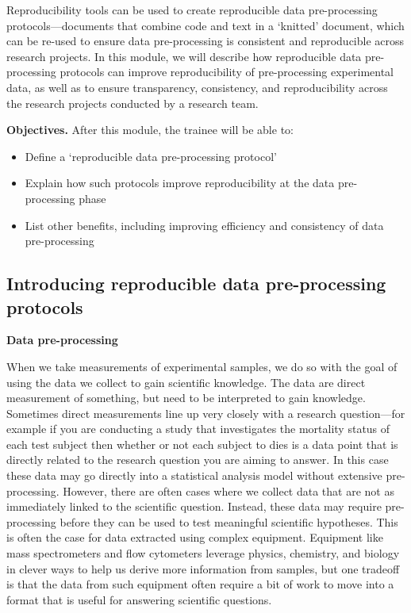 \documentclass[]{tufte-book}
\providecommand{\tightlist}{%
  \setlength{\itemsep}{0pt}\setlength{\parskip}{0pt}}
\begin{document}
Reproducibility tools can be used to create reproducible data pre-processing
protocols---documents that combine code and text in a `knitted' document, which
can be re-used to ensure data pre-processing is consistent and reproducible
across research projects. In this module, we will describe how reproducible data
pre-processing protocols can improve reproducibility of pre-processing
experimental data, as well as to ensure transparency, consistency, and
reproducibility across the research projects conducted by a research team.

\textbf{Objectives.} After this module, the trainee will be able to:

\begin{itemize}
\tightlist
\item
  Define a `reproducible data pre-processing protocol'
\item
  Explain how such protocols improve reproducibility at the data pre-processing
  phase
\item
  List other benefits, including improving efficiency and consistency of data
  pre-processing
\end{itemize}

\hypertarget{introducing-reproducible-data-pre-processing-protocols}{%
\subsection{Introducing reproducible data pre-processing protocols}\label{introducing-reproducible-data-pre-processing-protocols}}

\textbf{Data pre-processing}

When we take measurements of experimental samples, we do so with the goal of
using the data we collect to gain scientific knowledge. The data are direct
measurement of something, but need to be interpreted to gain knowledge.
Sometimes direct measurements line up very closely with a research
question---for example if you are conducting a study that investigates the
mortality status of each test subject then whether or not each subject to dies
is a data point that is directly related to the research question you are aiming
to answer. In this case these data may go directly into a statistical analysis
model without extensive pre-processing. However, there are often cases where we
collect data that are not as immediately linked to the scientific question.
Instead, these data may require pre-processing before they can be used to test
meaningful scientific hypotheses. This is often the case for data extracted
using complex equipment. Equipment like mass spectrometers and flow cytometers
leverage physics, chemistry, and biology in clever ways to help us derive more
information from samples, but one tradeoff is that the data from such equipment
often require a bit of work to move into a format that is useful for answering
scientific questions.
\end{document}
